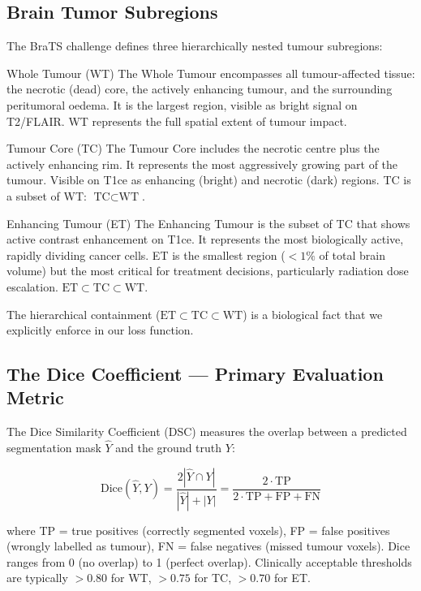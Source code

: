 \documentclass[12pt,a4paper]{article}
\begin{document}
\subsection{Brain Tumor Subregions}

The BraTS challenge defines three hierarchically nested tumour subregions:

\begin{defbox}{Whole Tumour (WT)}
The Whole Tumour encompasses all tumour-affected tissue: the necrotic (dead) core, the actively enhancing tumour, and the surrounding peritumoral oedema. It is the largest region, visible as bright signal on T2/FLAIR. WT represents the full spatial extent of tumour impact.
\end{defbox}

\begin{defbox}{Tumour Core (TC)}
The Tumour Core includes the necrotic centre plus the actively enhancing rim. It represents the most aggressively growing part of the tumour. Visible on T1ce as enhancing (bright) and necrotic (dark) regions. TC is a subset of WT: $\text{TC} \subset \text{WT}$.
\end{defbox}

\begin{defbox}{Enhancing Tumour (ET)}
The Enhancing Tumour is the subset of TC that shows active contrast enhancement on T1ce. It represents the most biologically active, rapidly dividing cancer cells. ET is the smallest region ($<1\%$ of total brain volume) but the most critical for treatment decisions, particularly radiation dose escalation. $\text{ET} \subset \text{TC} \subset \text{WT}$.
\end{defbox}

The hierarchical containment ($\text{ET} \subset \text{TC} \subset \text{WT}$) is a biological fact that we explicitly enforce in our loss function.

\subsection{The Dice Coefficient --- Primary Evaluation Metric}

The Dice Similarity Coefficient (DSC) measures the overlap between a predicted segmentation mask $\hat{Y}$ and the ground truth $Y$:

\[
\text{Dice}(\hat{Y}, Y) = \frac{2|\hat{Y} \cap Y|}{|\hat{Y}| + |Y|} = \frac{2 \cdot \text{TP}}{2\cdot\text{TP} + \text{FP} + \text{FN}}
\]

where TP = true positives (correctly segmented voxels), FP = false positives (wrongly labelled as tumour), FN = false negatives (missed tumour voxels). Dice ranges from 0 (no overlap) to 1 (perfect overlap). Clinically acceptable thresholds are typically $>0.80$ for WT, $>0.75$ for TC, $>0.70$ for ET.
\end{document}
